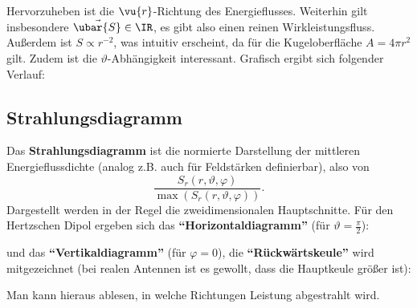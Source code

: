 		        Hervorzuheben ist die $\vu{r}$-Richtung des Energieflusses. Weiterhin gilt insbesondere $ \vec{\ubar{S}}\in\IR$, es gibt also einen reinen Wirkleistungsfluss. Außerdem ist $S\propto r^{-2}$, was intuitiv erscheint, da für die Kugeloberfläche $A=4\pi r^2$ gilt. Zudem ist die $\vartheta$-Abhängigkeit interessant. Grafisch ergibt sich folgender Verlauf:\\
		        

  \subsection{Strahlungsdiagramm}
		   Das \textbf{Strahlungsdiagramm} ist die normierte Darstellung der mittleren Energieflussdichte (analog z.B. auch für Feldstärken definierbar), also von
		        \begin{equation}
			        \frac{S_r(r,\vartheta, \varphi)}{\max(S_r(r,\vartheta, \varphi))}.
		        \end{equation}
		   Dargestellt werden in der Regel die zweidimensionalen Hauptschnitte.
		   Für den Hertzschen Dipol ergeben sich das \textbf{\enquote{Horizontaldiagramm}} (für \(\vartheta=\frac{\pi}{2}\)):

		        \begin{center}
			        
		        \end{center}

		   und das \textbf{\enquote{Vertikaldiagramm}} (für \(\varphi=0\)), die \textbf{\enquote{Rückwärtskeule}} wird mitgezeichnet (bei realen Antennen ist es gewollt, dass die Hauptkeule größer ist):

		        \begin{center}
			        
		        \end{center}
		        Man kann hieraus ablesen, in welche Richtungen Leistung abgestrahlt wird. 
